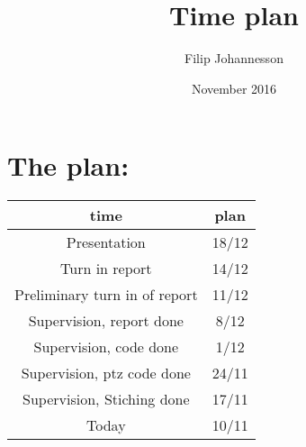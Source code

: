 \documentclass{article}
\title{Time plan}
\author{Filip Johannesson}
\date{November 2016}
\begin{document}
\maketitle

\section*{The plan:}

\begin{center}
\begin{tabular}{c||c}
     time &  plan\\ \hline
     Presentation & 18/12 \\
     Turn in report & 14/12 \\
     Preliminary turn in of report & 11/12 \\
     Supervision, report done & 8/12 \\
     Supervision, code done & 1/12 \\
     Supervision, ptz code done & 24/11 \\
     Supervision, Stiching done & 17/11 \\
     Today & 10/11 
\end{tabular}
\end{center}
\end{document}
